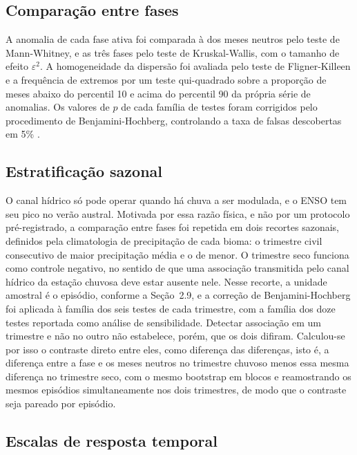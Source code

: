 \documentclass[a4paper,fleqn]{cas-sc}
\begin{document}
\subsection{Comparação entre fases}

A anomalia de cada fase ativa foi comparada à dos meses neutros pelo teste de Mann-Whitney, e as três fases pelo teste de Kruskal-Wallis, com o tamanho de efeito $\varepsilon^2$. A homogeneidade da dispersão foi avaliada pelo teste de Fligner-Killeen e a frequência de extremos por um teste qui-quadrado sobre a proporção de meses abaixo do percentil 10 e acima do percentil 90 da própria série de anomalias. Os valores de $p$ de cada família de testes foram corrigidos pelo procedimento de Benjamini-Hochberg, controlando a taxa de falsas descobertas em 5\% \citep{benjamini1995}.

\subsection{Estratificação sazonal}

O canal hídrico só pode operar quando há chuva a ser modulada, e o ENSO tem seu pico no verão austral. Motivada por essa razão física, e não por um protocolo pré-registrado, a comparação entre fases foi repetida em dois recortes sazonais, definidos pela climatologia de precipitação de cada bioma: o trimestre civil consecutivo de maior precipitação média e o de menor. O trimestre seco funciona como controle negativo, no sentido de que uma associação transmitida pelo canal hídrico da estação chuvosa deve estar ausente nele. Nesse recorte, a unidade amostral é o episódio, conforme a Seção~2.9, e a correção de Benjamini-Hochberg foi aplicada à família dos seis testes de cada trimestre, com a família dos doze testes reportada como análise de sensibilidade. Detectar associação em um trimestre e não no outro não estabelece, porém, que os dois difiram. Calculou-se por isso o contraste direto entre eles, como diferença das diferenças, isto é, a diferença entre a fase e os meses neutros no trimestre chuvoso menos essa mesma diferença no trimestre seco, com o mesmo bootstrap em blocos e reamostrando os mesmos episódios simultaneamente nos dois trimestres, de modo que o contraste seja pareado por episódio.

\subsection{Escalas de resposta temporal}
\end{document}
